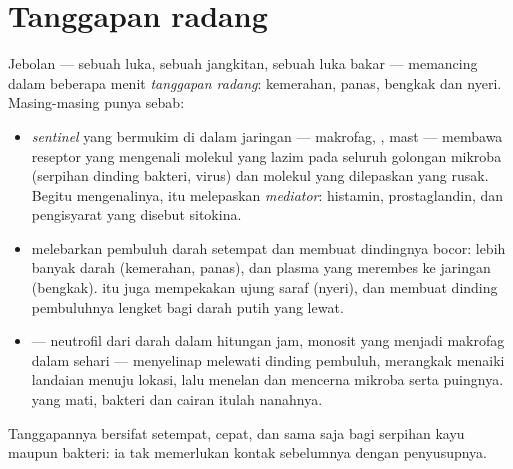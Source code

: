 \section{Tanggapan radang}

\begin{proposition}\label{prop:g12:innate-immunity:inflammation}
Jebolan --- sebuah luka, sebuah jangkitan, sebuah luka bakar ---
memancing dalam beberapa menit \emph{tanggapan
radang}: kemerahan, panas, bengkak dan nyeri.
Masing-masing punya sebab:
\begin{itemize}
  \item \emph{ sentinel} yang bermukim di dalam jaringan ---
        makrofag, ,  mast --- membawa reseptor yang
        mengenali molekul yang lazim pada seluruh golongan mikroba
        (serpihan dinding bakteri,  virus) dan molekul yang
        dilepaskan  yang rusak. Begitu mengenalinya,  itu
        melepaskan \emph{mediator}: histamin,
        prostaglandin, dan  pengisyarat yang disebut sitokina.
  \item {} melebarkan pembuluh darah setempat dan membuat
        dindingnya bocor: lebih banyak darah (kemerahan, panas), dan
        plasma yang merembes ke jaringan (bengkak).  itu juga
        mempekakan ujung saraf (nyeri), dan membuat dinding pembuluhnya
        lengket bagi  darah putih yang lewat.
  \item \emph{} --- neutrofil dari darah dalam hitungan jam,
        monosit yang menjadi makrofag dalam sehari --- menyelinap
        melewati dinding pembuluh, merangkak menaiki landaian
         menuju lokasi, lalu menelan dan mencerna mikroba
        serta puingnya.  yang mati, bakteri dan cairan itulah
        nanahnya.
\end{itemize}
Tanggapannya bersifat setempat, cepat, dan sama saja bagi serpihan kayu
maupun bakteri: ia tak memerlukan kontak sebelumnya dengan penyusupnya.
\end{proposition}
